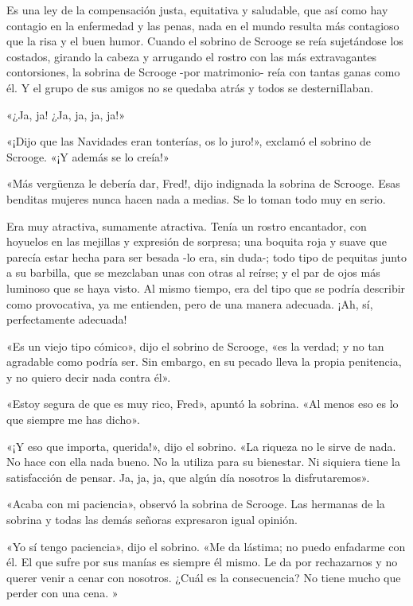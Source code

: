 \documentclass{novela}
\begin{document}
 Es una ley de la compensación justa, equitativa y saludable, que así como hay contagio en la enfermedad y las penas, nada en el mundo resulta más contagioso que la risa y el buen humor. Cuando el sobrino de Scrooge se reía sujetándose los costados, girando la cabeza y arrugando el rostro con las más extravagantes contorsiones, la sobrina de Scrooge -por matrimonio- reía con tantas ganas como él. Y el grupo de sus amigos no se quedaba atrás y todos se desterniIlaban.

 «¿Ja, ja! ¿Ja, ja, ja, ja!»

 «¡Dijo que las Navidades eran tonterías, os lo juro!», exclamó el sobrino de Scrooge. «¡Y además se lo creía!»

 «Más vergüenza le debería dar, Fred!, dijo indignada la sobrina de Scrooge. Esas benditas mujeres nunca hacen nada a medias. Se lo toman todo muy en serio.

 Era muy atractiva, sumamente atractiva. Tenía un rostro encantador, con hoyuelos en las mejillas y expresión de sorpresa; una boquita roja y suave que parecía estar hecha para ser besada -lo era, sin duda-; todo tipo de pequitas junto a su barbilla, que se mezclaban unas con otras al reírse; y el par de ojos más luminoso que se haya visto. Al mismo tiempo, era del tipo que se podría describir como provocativa, ya me entienden, pero de una manera adecuada. ¡Ah, sí, perfectamente adecuada!

 «Es un viejo tipo cómico», dijo el sobrino de Scrooge, «es la verdad; y no tan agradable como podría ser. Sin embargo, en su pecado lleva la propia penitencia, y no quiero decir nada contra él».

 «Estoy segura de que es muy rico, Fred», apuntó la sobrina. «Al menos eso es lo que siempre me has dicho».

 «¡Y eso que importa, querida!», dijo el sobrino. «La riqueza no le sirve de nada. No hace con ella nada bueno. No la utiliza para su bienestar. Ni siquiera tiene la satisfacción de pensar. Ja, ja, ja, que algún día nosotros la disfrutaremos».

 «Acaba con mi paciencia», observó la sobrina de Scrooge. Las hermanas de la sobrina y todas las demás señoras expresaron igual opinión.

 «Yo sí tengo paciencia», dijo el sobrino. «Me da lástima; no puedo enfadarme con él. El que sufre por sus manías es siempre él mismo. Le da por rechazarnos y no querer venir a cenar con nosotros. ¿Cuál es la consecuencia? No tiene mucho que perder con una cena. »
\end{document}
